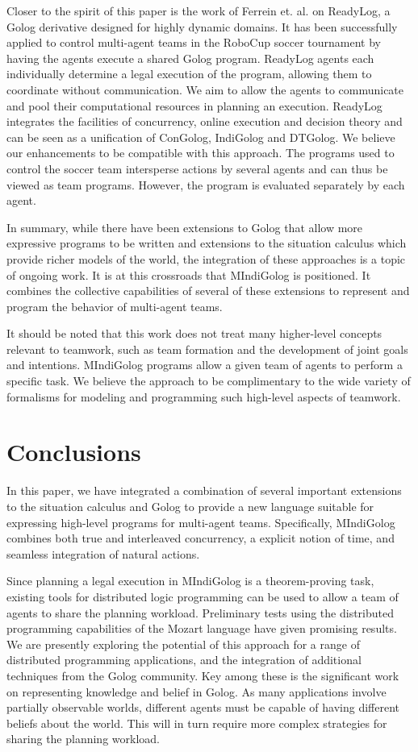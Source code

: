 \documentclass{llncs}
\begin{document}
Closer to the spirit of this paper is the work of Ferrein et. al.
\cite{Ferrein2005readylog} on ReadyLog, a Golog derivative designed
for highly dynamic domains. It has been successfully applied to control
multi-agent teams in the RoboCup soccer tournament by having the agents
execute a shared Golog program. ReadyLog agents
each individually determine a legal execution of the program, allowing
them to coordinate without communication.  We aim to allow the agents to
communicate and pool their computational resources in planning an
execution.
ReadyLog integrates
the facilities of concurrency, online execution and decision theory
and can be seen as a unification of ConGolog, IndiGolog and DTGolog.
We believe our enhancements to be compatible with this approach.
The programs used to control the soccer team intersperse actions by
several agents and can thus be viewed as team programs. However, the
program is evaluated separately by each agent.

In summary, while there have been extensions to Golog that allow more
expressive programs to be written and extensions to the situation
calculus which provide richer models of the world, the integration
of these approaches is a topic of ongoing work. It is at this crossroads
that MIndiGolog is positioned. It combines the
collective capabilities of several of these extensions to represent and program
the behavior of multi-agent teams.

It should be noted that this work does not treat many higher-level concepts
relevant
to teamwork, such as team formation and the development of joint goals and
intentions.  MIndiGolog programs allow a given team of agents to
perform a specific task.  We believe the approach to be complimentary to
the wide variety of formalisms for modeling and programming such high-level
aspects of teamwork.

\section{Conclusions}

In this paper, we have integrated a combination of several important
extensions to the situation calculus and Golog to provide a new language
suitable for expressing high-level programs for multi-agent teams.
Specifically, MIndiGolog combines both true and interleaved concurrency,
a explicit notion of time, and seamless integration of natural actions.

Since planning a legal execution in MIndiGolog is a theorem-proving
task, existing tools for distributed logic programming can be used to
allow a team of agents to share the planning workload.  Preliminary
tests using the distributed programming capabilities of the Mozart language
\cite{vanroy99mozart} have given promising results.
We are presently exploring the potential of this approach for a range
of distributed programming applications, and the integration of additional
techniques from the Golog community. Key among
these is the significant work on representing knowledge and belief
in Golog. As many applications involve partially observable worlds,
different agents must be capable of having different beliefs about
the world.  This will in turn require more complex strategies for
sharing the planning workload.
\end{document}
